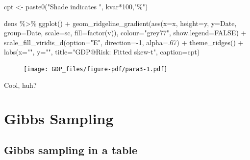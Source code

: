 \documentclass[
  letterpaper,
]{book}
\newenvironment{Shaded}{\begin{snugshade}}{\end{snugshade}}
\newcommand{\AttributeTok}[1]{\textcolor[rgb]{0.40,0.45,0.13}{#1}}
\newcommand{\ConstantTok}[1]{\textcolor[rgb]{0.56,0.35,0.01}{#1}}
\newcommand{\DecValTok}[1]{\textcolor[rgb]{0.68,0.00,0.00}{#1}}
\newcommand{\FunctionTok}[1]{\textcolor[rgb]{0.28,0.35,0.67}{#1}}
\newcommand{\NormalTok}[1]{\textcolor[rgb]{0.00,0.23,0.31}{#1}}
\newcommand{\OtherTok}[1]{\textcolor[rgb]{0.00,0.23,0.31}{#1}}
\newcommand{\SpecialCharTok}[1]{\textcolor[rgb]{0.37,0.37,0.37}{#1}}
\newcommand{\StringTok}[1]{\textcolor[rgb]{0.13,0.47,0.30}{#1}}
\begin{document}
\begin{Shaded}
\begin{Highlighting}[]
\NormalTok{cpt }\OtherTok{\textless{}{-}} \FunctionTok{paste0}\NormalTok{(}\StringTok{"Shade indicates "}\NormalTok{, kvar}\SpecialCharTok{*}\DecValTok{100}\NormalTok{,}\StringTok{"\%"}\NormalTok{)}

\NormalTok{dens }\SpecialCharTok{\%\textgreater{}\%} 
  \FunctionTok{ggplot}\NormalTok{() }\SpecialCharTok{+} 
  \FunctionTok{geom\_ridgeline\_gradient}\NormalTok{(}\FunctionTok{aes}\NormalTok{(}\AttributeTok{x=}\NormalTok{x, }\AttributeTok{height=}\NormalTok{y, }\AttributeTok{y=}\NormalTok{Date, }\AttributeTok{group=}\NormalTok{Date, }\AttributeTok{scale=}\NormalTok{sc, }\AttributeTok{fill=}\FunctionTok{factor}\NormalTok{(v)),  }
                          \AttributeTok{colour=}\StringTok{"grey77"}\NormalTok{, }\AttributeTok{show.legend=}\ConstantTok{FALSE}\NormalTok{) }\SpecialCharTok{+}
  \FunctionTok{scale\_fill\_viridis\_d}\NormalTok{(}\AttributeTok{option=}\StringTok{"E"}\NormalTok{, }\AttributeTok{direction=}\SpecialCharTok{{-}}\DecValTok{1}\NormalTok{, }\AttributeTok{alpha=}\NormalTok{.}\DecValTok{67}\NormalTok{) }\SpecialCharTok{+}
  \FunctionTok{theme\_ridges}\NormalTok{() }\SpecialCharTok{+} 
  \FunctionTok{labs}\NormalTok{(}\AttributeTok{x=}\StringTok{""}\NormalTok{, }\AttributeTok{y=}\StringTok{""}\NormalTok{, }\AttributeTok{title=}\StringTok{"GDP@Risk: Fitted skew{-}t"}\NormalTok{, }\AttributeTok{caption=}\NormalTok{cpt)}
\end{Highlighting}
\end{Shaded}

\begin{figure}[H]

{\centering \texttt{[image: GDP\_files/figure-pdf/para3-1.pdf]}

}

\end{figure}

Cool, huh?

\hypertarget{gibbs-sampling}{%
\chapter{Gibbs Sampling}\label{gibbs-sampling}}

\hypertarget{gibbs-sampling-in-a-table}{%
\section{Gibbs sampling in a table}\label{gibbs-sampling-in-a-table}}
\end{document}

